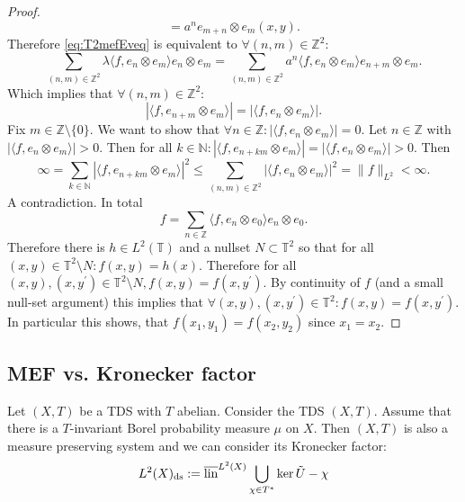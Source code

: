 \begin{proof}
\begin{equation*}
    = a^n e_{m+n} \otimes e_m (x,y).
  \end{equation*}
  Therefore \cref{eq:T2mefEveq} is equivalent to $\forall (n,m) \in \mathbb{Z}^2$:
  \begin{equation*}
    \sum_{(n,m) \in \mathbb{Z}^2} \lambda \langle f, e_n \otimes e_m \rangle e_n \otimes e_m = 
    \sum_{(n,m) \in \mathbb{Z}^2} a^n \langle f, e_n \otimes e_m \rangle e_{n+m} \otimes e_m.
  \end{equation*}
  Which implies that
$\forall (n,m) \in \mathbb{Z}^2$:
\begin{equation*}
  |\langle f, e_{n+m} \otimes e_m \rangle|  = |\langle f, e_n \otimes e_m \rangle|.
\end{equation*}
  Fix $m \in \mathbb{Z} \setminus \{0\}$.
  We want to show that $\forall n \in \mathbb{Z}: |\langle f, e_n \otimes e_m \rangle| = 0$.
  Let $n \in \mathbb{Z}$ with $|\langle f, e_n \otimes e_m \rangle| > 0$.
  Then for all $k \in \mathbb{N}: |\langle f, e_{n+km} \otimes e_m \rangle| = |\langle f, e_n \otimes e_m \rangle|>0$.
  Then
  \begin{equation*}
    \infty = \sum_{k \in \mathbb{N} } |\langle f, e_{n+km} \otimes e_m \rangle|^2
    \leq   \sum_{(n,m) \in \mathbb{Z}^2} |\langle f, e_{n} \otimes e_m \rangle|^2 
    =\|f\|_{L^2} < \infty.
  \end{equation*}
  A contradiction.
  In total
  \begin{equation*}
    f = \sum_{n \in \mathbb{Z}} \langle f, e_n \otimes e_0 \rangle e_n \otimes e_0.
  \end{equation*}
  Therefore there is $h \in L^2(\mathbb{T})$ and a nullset $N \subset \mathbb{T}^2$ so that for all $(x,y) \in \mathbb{T}^2 \setminus N : f(x,y) = h(x)$.
  Therefore for all  $(x,y) , (x,y^\prime) \in \mathbb{T}^2 \setminus N , f(x,y) = f(x,y^\prime)$. 
  By continuity of $f$ (and a small null-set argument) this implies that $\forall (x,y), (x,y^\prime) \in \mathbb{T}^2 : f(x,y) = f(x,y^\prime)$.
  In particular this shows, that $f(x_1,y_1) = f(x_2, y_2)$ since $x_1 = x_2$.
\end{proof}

\subsection{MEF vs. Kronecker factor}
Let $(X,T)$ be a TDS with $T$ abelian.
Consider the TDS $(X,T)$.
Assume that there is a $T$-invariant Borel probability measure $\mu$ on $X$.
Then $(X,T)$ is also a measure preserving system and we can consider its Kronecker factor:
\begin{equation*}
  L^2 (X)_{\mathrm{ds}}:= \overline{\operatorname{lin}}^{L^2(X)}  \bigcup_{\chi \in T^*} \ker \tilde{U} - \chi
\end{equation*}
